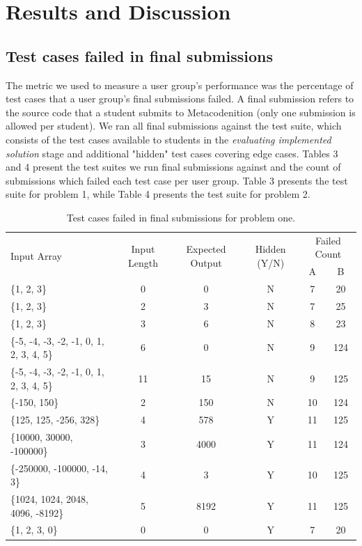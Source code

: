 \documentclass[sigconf,authorversion,nonacm]{acmart}
\begin{document}
\section{Results and Discussion}
\subsection{Test cases failed in final submissions}
The metric we used to measure a user group's performance was the percentage of test cases that a user group's final submissions failed. A final submission refers to the source code that a student submits to Metacodenition (only one submission is allowed per student). We ran all final submissions against the test suite, which consists of the test cases available to students in the \emph{evaluating implemented solution} stage and additional "hidden" test cases covering edge cases. Tables 3 and 4 present the test suites we run final submissions against and the count of submissions which failed each test case per user group. Table 3 presents the test suite for problem 1, while Table 4 presents the test suite for problem 2.

\begin{table}
  \caption{Test cases failed in final submissions for problem one.}
  \label{tab:freq}
  \begin{tabular}{l|c|c|c|c|c}
    \toprule
    \multirow{2}{*}{Input Array} & \multirow{2}{*}{Input Length} & \multirow{2}{*}{Expected Output} & \multirow{2}{*}{Hidden (Y/N)} & \multicolumn{2}{c}{Failed Count} \\
    \cmidrule{5-6}
    & & & & A & B \\
    \midrule
    \{1, 2, 3\} & 0 & 0 & N & 7 & 20 \\
    \midrule
     \{1, 2, 3\} & 2 & 3 & N & 7 & 25 \\
    \midrule
    \{1, 2, 3\} & 3 & 6 & N & 8 & 23 \\
    \midrule
    \{-5, -4, -3, -2, -1, 0, 1, 2, 3, 4, 5\} & 6 & 0 & N & 9 & 124\\
    \midrule
    \{-5, -4, -3, -2, -1, 0, 1, 2, 3, 4, 5\} & 11 & 15 & N & 9 & 125\\
    \midrule
    \{-150, 150\} & 2 & 150 & N & 10 & 124\\
    \midrule
    \{125, 125, -256, 328\} & 4 & 578 & Y & 11 & 125\\
    \midrule
    \{10000, 30000, -100000\} & 3 & 4000 & Y & 11 & 124\\
    \midrule
    \{-250000, -100000, -14, 3\} & 4 & 3 & Y & 10 & 125 \\
    \midrule
    \{1024, 1024, 2048, 4096, -8192\} & 5 & 8192 & Y & 11 & 125\\
    \midrule
    \{1, 2, 3, 0\} & 0 & 0 & Y & 7 & 20 \\
  \bottomrule
\end{tabular}
\end{table}
\end{document}
